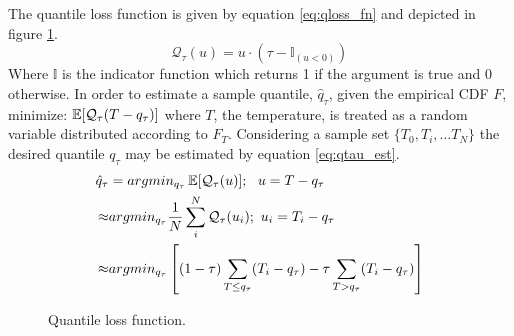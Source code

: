 The quantile loss function is given by equation \ref{eq:qloss_fn} and depicted in figure \ref{fig:qloss}.
\begin{equation}
\mathcal Q_\tau( u) =  u \cdot (\tau - \mathbb{I}_{( u < 0)})
\label{eq:qloss_fn}
\end{equation}
Where $\mathbb{I}$ is the indicator function which returns 1 if the argument is true and 0 otherwise.
In order to estimate a sample quantile, $\hat q_\tau$, given the empirical CDF $F$, minimize: $\operatorname*{\mathbb{E}}[\mathcal Q_\tau(T - q_\tau)]$ where $T$, the temperature, is treated as a random variable distributed according to $F_T$.  Considering a sample set $\{T_0, T_i, \dots T_N \}$ the desired quantile $q_\tau$ may be estimated by equation \ref{eq:qtau_est}.
\begin{equation}
            \left.\begin{aligned}
            \hat q_{\tau} &= argmin_{q_\tau} \operatorname*{\mathbb{E}}[\mathcal Q_\tau(u)];\ \  u = T - q_\tau  \\
            \approx & argmin_{q_\tau}  \frac{1}{N} \sum_i^N \mathcal Q_\tau(u_i); \ u_i = T_i - q_\tau \\
            \approx & argmin_{q_\tau} \left[ (1-\tau) \sum_{T \leq q_\tau}( T_i - q_\tau ) - \tau \sum_{T > q_\tau} (T_i - q_\tau) \right]
            \end{aligned}\right.
            \label{eq:qtau_est}
\end{equation}


\begin{figure}[H]
	\centering
    \caption[Quantile loss function.]{Quantile loss function.}
\label{fig:qloss}
\end{figure}

